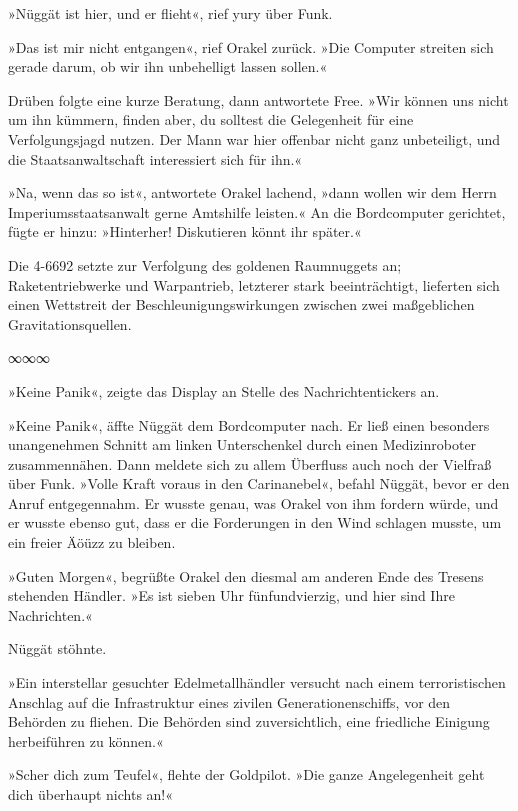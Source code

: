 »Nüggät ist hier, und er flieht«, rief yury über Funk.

»Das ist mir nicht entgangen«, rief Orakel zurück. »Die Computer streiten sich gerade darum, ob wir ihn unbehelligt lassen sollen.«

Drüben folgte eine kurze Beratung, dann antwortete Free. »Wir können uns nicht um ihn kümmern, finden aber, du solltest die Gelegenheit für eine Verfolgungsjagd nutzen. Der Mann war hier offenbar nicht ganz unbeteiligt, und die Staatsanwaltschaft interessiert sich für ihn.«

»Na, wenn das so ist«, antwortete Orakel lachend, »dann wollen wir dem Herrn Imperiumsstaatsanwalt gerne Amtshilfe leisten.« An die Bordcomputer gerichtet, fügte er hinzu: »Hinterher! Diskutieren könnt ihr später.«

Die 4-6692 setzte zur Verfolgung des goldenen Raumnuggets an; Raketentriebwerke und Warpantrieb, letzterer stark beeinträchtigt, lieferten sich einen Wettstreit der Beschleunigungswirkungen zwischen zwei maßgeblichen Gravitationsquellen.

\begin{center}
	∞∞∞
\end{center}

»Keine Panik«, zeigte das Display an Stelle des Nachrichtentickers an.

»Keine Panik«, äffte Nüggät dem Bordcomputer nach. Er ließ einen besonders unangenehmen Schnitt am linken Unterschenkel durch einen Medizinroboter zusammennähen. Dann meldete sich zu allem Überfluss auch noch der Vielfraß über Funk. »Volle Kraft voraus in den Carinanebel«, befahl Nüggät, bevor er den Anruf entgegennahm. Er wusste genau, was Orakel von ihm fordern würde, und er wusste ebenso gut, dass er die Forderungen in den Wind schlagen musste, um ein freier Äöüzz zu bleiben.

»Guten Morgen«, begrüßte Orakel den diesmal am anderen Ende des Tresens stehenden Händler. »Es ist sieben Uhr fünfundvierzig, und hier sind Ihre Nachrichten.«

Nüggät stöhnte.

»Ein interstellar gesuchter Edelmetallhändler versucht nach einem terroristischen Anschlag auf die Infrastruktur eines zivilen Generationenschiffs, vor den Behörden zu fliehen. Die Behörden sind zuversichtlich, eine friedliche Einigung herbeiführen zu können.«

»Scher dich zum Teufel«, flehte der Goldpilot. »Die ganze Angelegenheit geht dich überhaupt nichts an!«

